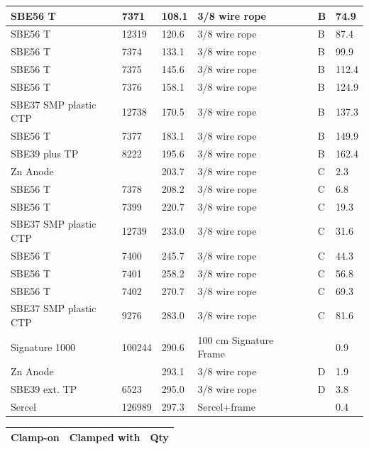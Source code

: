 \documentclass{article}
\begin{document}
\begin{tabularx}{\linewidth}{|X|l|l|X|l|l|l|}
SBE56 T & 7371 & 108.1 & 3/8 wire rope &  & B & 74.9 \\ \hline
SBE56 T & 12319 & 120.6 & 3/8 wire rope &  & B & 87.4 \\ \hline
SBE56 T & 7374 & 133.1 & 3/8 wire rope &  & B & 99.9 \\ \hline
SBE56 T & 7375 & 145.6 & 3/8 wire rope &  & B & 112.4 \\ \hline
SBE56 T & 7376 & 158.1 & 3/8 wire rope &  & B & 124.9 \\ \hline
SBE37 SMP plastic CTP & 12738 & 170.5 & 3/8 wire rope &  & B & 137.3 \\ \hline
SBE56 T & 7377 & 183.1 & 3/8 wire rope &  & B & 149.9 \\ \hline
SBE39 plus TP & 8222 & 195.6 & 3/8 wire rope &  & B & 162.4 \\ \hline
Zn Anode &  & 203.7 & 3/8 wire rope &  & C & 2.3 \\ \hline
SBE56 T & 7378 & 208.2 & 3/8 wire rope &  & C & 6.8 \\ \hline
SBE56 T & 7399 & 220.7 & 3/8 wire rope &  & C & 19.3 \\ \hline
SBE37 SMP plastic CTP & 12739 & 233.0 & 3/8 wire rope &  & C & 31.6 \\ \hline
SBE56 T & 7400 & 245.7 & 3/8 wire rope &  & C & 44.3 \\ \hline
SBE56 T & 7401 & 258.2 & 3/8 wire rope &  & C & 56.8 \\ \hline
SBE56 T & 7402 & 270.7 & 3/8 wire rope &  & C & 69.3 \\ \hline
SBE37 SMP plastic CTP & 9276 & 283.0 & 3/8 wire rope &  & C & 81.6 \\ \hline
Signature 1000 & 100244 & 290.6 & 100 cm Signature Frame &  &  & 0.9 \\ \hline
Zn Anode &  & 293.1 & 3/8 wire rope &  & D & 1.9 \\ \hline
SBE39 ext. TP & 6523 & 295.0 & 3/8 wire rope &  & D & 3.8 \\ \hline
Sercel & 126989 & 297.3 & Sercel+frame &  &  & 0.4 \\ \hline
\end{tabularx}
\begin{tabularx}{\linewidth}{|l|l|l|}
\caption{W310 \textcolor{blue}{$\blacksquare$}: Clamped with summary}\\
\hline
\textbf{Clamp-on} & \textbf{Clamped with} & \textbf{Qty} \\
\hline
\end{tabularx}
\end{document}
